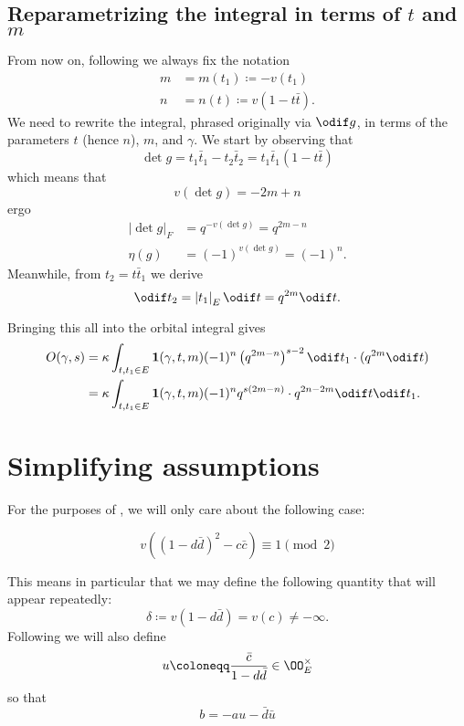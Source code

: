 \subsection{Reparametrizing the integral in terms of $t$ and $m$}
From now on, following \cite{ref:AFL} we always fix the notation
\begin{align*}
  m &= m(t_1) \coloneqq -v(t_1) \\
  n &= n(t) \coloneqq v(1-t\bar t).
\end{align*}
We need to rewrite the integral, phrased originally via $\odif g$,
in terms of the parameters $t$ (hence $n$), $m$, and $\gamma$.
We start by observing that
\[ \det g = t_1 \bar t_1 - t_2 \bar t_2 = t_1 \bar t_1 (1 - t\bar t) \]
which means that
\[ v(\det g) = -2m + n \]
ergo
\begin{align*}
  \left\lvert \det g \right\rvert_F &= q^{-v(\det g)} = q^{2m-n} \\
  \eta(g) &= (-1)^{v(\det g)} = (-1)^n.
\end{align*}
Meanwhile, from $t_2 = t \bar t_1$ we derive
\[ \odif t_2 = \left\lvert t_1 \right\rvert_E \odif t = q^{2m} \odif t. \]

Bringing this all into the orbital integral gives
\begin{align*}
  O(\gamma, s) &= \kappa \int_{t, t_1 \in E} \mathbf{1}(\gamma, t, m)
  (-1)^n \left( q^{2m-n} \right)^{s-2} \odif t_1 \cdot (q^{2m} \odif t) \\
  &= \kappa \int_{t, t_1 \in E} \mathbf{1}(\gamma, t, m)
  (-1)^n q^{s(2m-n)} \cdot q^{2n-2m} \odif t \odif t_1.
\end{align*}

\section{Simplifying assumptions}
For the purposes of \cite{ref:AFL},
we will only care about the following case:
\begin{assume}
  \[ v\left( (1-d\bar d)^2 - c \bar c\right) \equiv 1 \pmod 2 \]
\end{assume}
This means in particular that we may define the following quantity
that will appear repeatedly:
\begin{equation}
  \delta \coloneqq v(1-d \bar d) = v(c) \neq -\infty.
  \label{eqn:delta}
\end{equation}
Following \cite{ref:AFL} we will also define
\begin{equation}
  u \coloneqq \frac{\bar c}{1-d \bar d} \in \OO_E^\times
  \label{eqn:u}
\end{equation}
so that
\begin{equation}
  b = -au - \bar{d} \bar{u}
  \label{eqn:b}
\end{equation}

